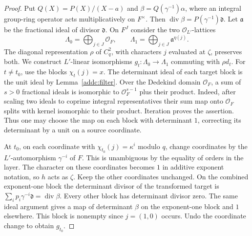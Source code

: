 \begin{proof}
Put \(Q(X)=P(X)/(X-a)\) and \(\beta=Q(\gamma^{-1})\alpha\),
where an integral group-ring operator acts multiplicatively on
\(F^\times\). Then
\(\operatorname{div}\beta=P(\gamma^{-1})\mathfrak d\).
Let \(\mathfrak a\) be the fractional ideal of divisor \(\mathfrak d\).
On \(F^J\) consider the two \(\mathcal O_{L'}\)-lattices
\[
 \Lambda_0=\bigoplus_{j\in J}\mathcal O_F,\qquad
 \Lambda_1=\bigoplus_{j\in J}\mathfrak a^{\eta(j)}.
\]
The diagonal representation \(\rho\) of \(C_q^2\), with characters
\(j\) evaluated at \(\zeta\), preserves both. We construct
\(L'\)-linear isomorphisms \(g_t:\Lambda_0\to\Lambda_1\) commuting
with \(\rho d_t\). For \(t\ne t_0\), use the blocks
\(\chi_t(j)=x\). The determinant ideal of each target block is the
unit ideal by Lemma~\ref{addc:filter}. Over the Dedekind domain
\(\mathcal O_F\), a sum of \(s>0\) fractional ideals is isomorphic
to \(\mathcal O_F^{s-1}\) plus their product. Indeed, after scaling
two ideals to coprime integral representatives their sum map onto
\(\mathcal O_F\) splits with kernel isomorphic to their product.
Iteration proves the assertion. Thus one may choose the map on
each block with determinant \(1\), correcting its determinant by
a unit on a source coordinate.

At \(t_0\), on each coordinate with \(\chi_{t_0}(j)=\kappa^i\)
modulo \(q\), change coordinates by the \(L'\)-automorphism
\(\gamma^{-i}\) of \(F\). This is unambiguous by the equality of
orders in the layer. The character on these coordinates becomes \(1\)
in additive exponent notation, so \(h\) acts as \(\zeta\).
Keep the other coordinates unchanged. On the combined exponent-one
block the determinant divisor of the transformed target is
\(\sum_i p_i\gamma^{-i}\mathfrak d=\operatorname{div}\beta\).
Every other block has determinant divisor zero. The same ideal
argument gives a map of determinant \(\beta\) on the exponent-one
block and \(1\) elsewhere. This block is nonempty since \(j=(1,0)\)
occurs. Undo the coordinate change to obtain \(g_{t_0}\).


\end{proof}
